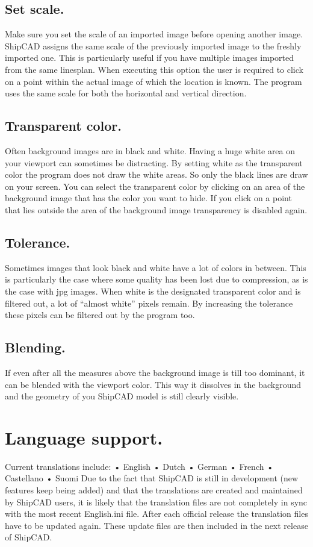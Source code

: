 \documentclass[12pt]{article}
\begin{document}
\subsection{Set scale.}
Make sure you set the scale of an imported image before opening another image. ShipCAD
assigns the same scale of the previously imported image to the freshly imported one. This is
particularly useful if you have multiple images imported from the same linesplan. When executing
this option the user is required to click on a point within the actual image of which the location is
known. The program uses the same scale for both the horizontal and vertical direction.

\subsection{Transparent color.}
Often background images are in black and white. Having a huge white area on your viewport can
sometimes be distracting. By setting white as the transparent color the program does not draw the
white areas. So only the black lines are draw on
your screen. You can select the transparent color
by clicking on an area of the background image
that has the color you want to hide. If you click on
a point that lies outside the area of the
background image transparency is disabled
again.

\subsection{Tolerance.}
Sometimes images that look black and white
have a lot of colors in between. This is
particularly the case where some quality has
been lost due to compression, as is the case
with jpg images. When white is the designated
transparent color and is filtered out, a lot of
“almost white” pixels remain. By increasing the
tolerance these pixels can be filtered out by the
program too.

\subsection{Blending.}
If even after all the measures above the background image is till too dominant, it can be blended
with the viewport color. This way it dissolves in the background and the geometry of you ShipCAD
model is still clearly visible.

\section{Language support.} \label{language-support}
Current translations include:
•
 English
•
 Dutch
•
 German
•
 French
•
 Castellano
•
 Suomi
Due to the fact that ShipCAD is still in development (new features keep being added) and that the
translations are created and maintained by ShipCAD users, it is likely that the translation files are
not completely in sync with the most recent English.ini file. After each official release the translation
files have to be updated again. These update files are then included in the next release of
ShipCAD.
\end{document}
